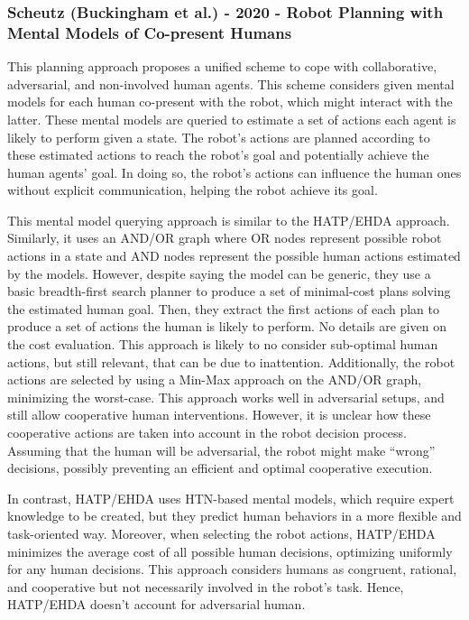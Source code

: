 \subsubsection{Scheutz (Buckingham et al.) - 2020 - Robot Planning with Mental Models of Co-present Humans}
\label{w4}

This planning approach proposes a unified scheme to cope with collaborative, adversarial, and non-involved human agents. This scheme considers given mental models for each human co-present with the robot, which might interact with the latter. These mental models are queried to estimate a set of actions each agent is likely to perform given a state. The robot's actions are planned according to these estimated actions to reach the robot's goal and potentially achieve the human agents' goal. In doing so, the robot's actions can influence the human ones without explicit communication, helping the robot achieve its goal.

This mental model querying approach is similar to the HATP/EHDA approach. Similarly, it uses an AND/OR graph where OR nodes represent possible robot actions in a state and AND nodes represent the possible human actions estimated by the models. However, despite saying the model can be generic, they use a basic breadth-first search planner to produce a set of minimal-cost plans solving the estimated human goal. Then, they extract the first actions of each plan to produce a set of actions the human is likely to perform. No details are given on the cost evaluation. This approach is likely to no consider sub-optimal human actions, but still relevant, that can be due to inattention. Additionally, the robot actions are selected by using a Min-Max approach on the AND/OR graph, minimizing the worst-case. This approach works well in adversarial setups, and still allow cooperative human interventions. However, it is unclear how these cooperative actions are taken into account in the robot decision process. Assuming that the human will be adversarial, the robot might make ``wrong'' decisions, possibly preventing an efficient and optimal cooperative execution.

In contrast, HATP/EHDA uses HTN-based mental models, which require expert knowledge to be created, but they predict human behaviors in a more flexible and task-oriented way.
Moreover, when selecting the robot actions, HATP/EHDA minimizes the average cost of all possible human decisions, optimizing uniformly for any human decisions. This approach considers humans as congruent, rational, and cooperative but not necessarily involved in the robot's task. Hence, HATP/EHDA doesn't account for adversarial human.

